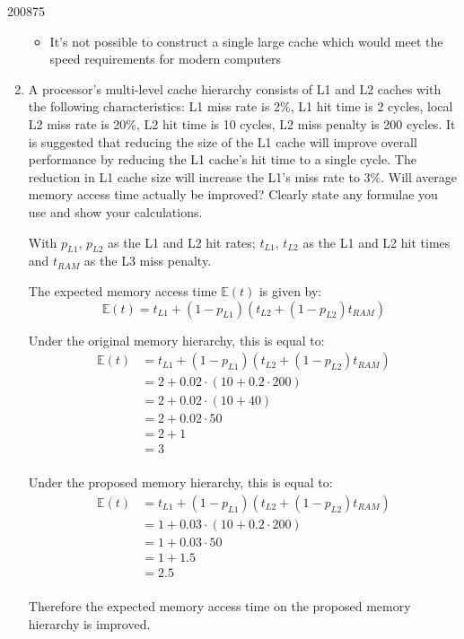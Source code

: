 \documentclass[10pt,\jkfside,a4paper]{article}
\begin{document}
\begin{examquestion}{2008}{7}{5}
\begin{enumerate}[label=(\alph*)]
\begin{itemize}
\item It's not possible to construct a single large cache which would meet
the speed requirements for modern computers

\end{itemize}

\fi

\setcounter{enumi}{1}

\item A processor's multi-level cache hierarchy consists of L1 and L2 caches
with the following characteristics: L1 miss rate is 2\%, L1 hit time is 2
cycles, local L2 miss rate is 20\%, L2 hit time is 10 cycles, L2 miss
penalty is 200 cycles. It is suggested that reducing the size of the L1
cache will improve overall performance by reducing the L1 cache's hit time
to a single cycle. The reduction in L1 cache size will increase the L1's
miss rate to 3\%. Will average memory access time actually be improved?
Clearly state any formulae you use and show your calculations.

With $p_{L1}$, $p_{L2}$ as the L1 and L2 hit rates; $t_{L1}$, $t_{L2}$ as
the L1 and L2 hit times and $t_{RAM}$ as the L3 miss penalty.

The expected memory access time $\mathbb{E}(t)$ is given by:
\[
\mathbb{E}(t) = t_{L1} + \left(1 - p_{L1}\right)\left(
t_{L2}  + \left( 1 - p_{L2} \right)t_{RAM}\right)
\]

Under the original memory hierarchy, this is equal to:
\[
\begin{split}
\mathbb{E}(t) &= t_{L1} + \left(1 - p_{L1}\right)\left(
t_{L2}  + \left( 1 - p_{L2} \right)t_{RAM}\right) \\
&= 2 + 0.02 \cdot \left( 10 + 0.2 \cdot 200 \right) \\
&= 2 + 0.02 \cdot (10 + 40) \\
&= 2 + 0.02 \cdot 50 \\
&= 2 + 1 \\
&= 3 \\
\end{split}
\]

Under the proposed memory hierarchy, this is equal to:
\[
\begin{split}
\mathbb{E}(t) &= t_{L1} + \left(1 - p_{L1}\right)\left(
t_{L2}  + \left( 1 - p_{L2} \right)t_{RAM}\right) \\
&= 1 + 0.03 \cdot \left( 10 + 0.2 \cdot 200 \right) \\
&= 1 + 0.03 \cdot 50 \\
&= 1 + 1.5 \\
&= 2.5 \\
\end{split}
\]

Therefore the expected memory access time on the proposed memory hierarchy is
improved.

\end{enumerate}

\end{examquestion}
\end{document}
